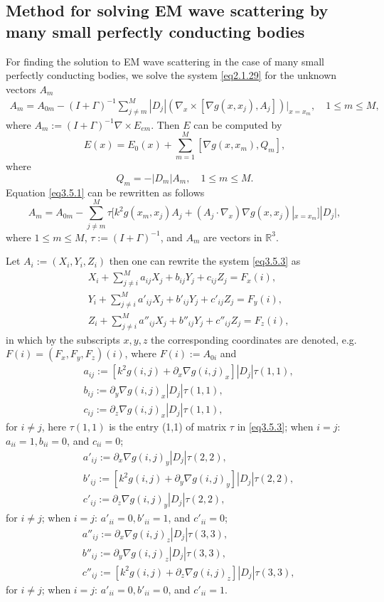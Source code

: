 \documentclass[12pt]{article}
\numberwithin{equation}{section}
\newcommand{\be}{\begin{equation}}
\newcommand{\ee}{\end{equation}}
\newcommand{\RRR}{\mathbb{R}^3}
\begin{document}
\subsection{Method for solving EM wave scattering by many small perfectly conducting bodies}\label{sec3.5}
For finding the solution to EM wave scattering in the case of many small perfectly conducting bodies, we  solve the system \eqref{eq2.1.29} for the unknown vectors $A_m$
\begin{align}
	A_m=A_{0m}-(I+\Gamma)^{-1}\sum_{j\ne m}^M |D_j|\left(\nabla_x\times [\nabla g(x,x_j),A_j] \right) |_{x=x_m}, \quad  1 \le m \le M, \label{eq3.5.1}
\end{align}
where $A_m:=(I+\Gamma)^{-1}\nabla \times E_{em}$. Then $E$ can be computed by
\be \label{eq3.5.2}
    E(x)=E_0(x)+\sum_{m=1}^M [\nabla g(x,x_m), Q_m],
\ee
where
\be \label{eq3.5.2a}
    Q_m=-|D_m|A_m, \quad 1 \le m \le M.
\ee
Equation \eqref{eq3.5.1} can be rewritten as follows
\be \label{eq3.5.3}
    A_m=A_{0m}-\sum_{j\ne m}^M \tau[k^2 g(x_m,x_j)A_j+(A_j\cdot \nabla_x)\nabla g(x,x_j)|_{x=x_m}]|D_j|,
\ee
where $1 \le m \le M$, $\tau:=(I+\Gamma)^{-1}$, and $A_m$ are vectors in $\RRR$.

Let $A_i:=(X_i,Y_i,Z_i)$ then one can rewrite the system \eqref{eq3.5.3} as
\begin{align}
    &X_i+\sum_{j\neq i}^M a_{ij}X_j +  b_{ij}Y_j +  c_{ij}Z_j = F_x(i), \label{eq3.5.7}\\
    &Y_i+\sum_{j\neq i}^M a'_{ij}X_j +  b'_{ij}Y_j +  c'_{ij}Z_j = F_y(i), \label{eq3.5.8}\\
    &Z_i+\sum_{j\neq i}^M a''_{ij}X_j +  b''_{ij}Y_j +  c''_{ij}Z_j = F_z(i), \label{eq3.5.9}
\end{align}
in which by the subscripts $x,y,z$ the corresponding coordinates are denoted, e.g. $F(i)=(F_x,F_y,F_z)(i)$, where $F(i):=A_{0i}$ and
\begin{align}
    &a_{ij}:=[k^2 g(i,j) + \partial_{x} \nabla g(i,j)_x]|D_j|\tau(1,1),\\
    &b_{ij}:=\partial_{y} \nabla g(i,j)_x|D_j|\tau(1,1),\\
    &c_{ij}:=\partial_{z} \nabla g(i,j)_x|D_j|\tau(1,1),
\end{align}
for $i\neq j$, here $\tau(1,1)$ is the entry (1,1) of matrix $\tau$ in \eqref{eq3.5.3}; when $i=j$: $a_{ii}=1, b_{ii}=0$, and $c_{ii}=0$;
\begin{align}
    &a'_{ij}:=\partial_{x} \nabla g(i,j)_y|D_j|\tau(2,2),\\
    &b'_{ij}:=[k^2 g(i,j) + \partial_{y} \nabla g(i,j)_y]|D_j|\tau(2,2),\\
    &c'_{ij}:=\partial_{z} \nabla g(i,j)_y|D_j|\tau(2,2),
\end{align}
for $i\neq j$; when $i=j$: $a'_{ii}=0, b'_{ii}=1$, and $c'_{ii}=0$;
\begin{align}
    &a''_{ij}:=\partial_{x} \nabla g(i,j)_z|D_j|\tau(3,3),\\
    &b''_{ij}:=\partial_{y} \nabla g(i,j)_z|D_j|\tau(3,3),\\
    &c''_{ij}:=[k^2 g(i,j) + \partial_{z} \nabla g(i,j)_z]|D_j|\tau(3,3),
\end{align}
for $i\neq j$; when $i=j$: $a'_{ii}=0, b'_{ii}=0$, and $c'_{ii}=1$.
\end{document}
